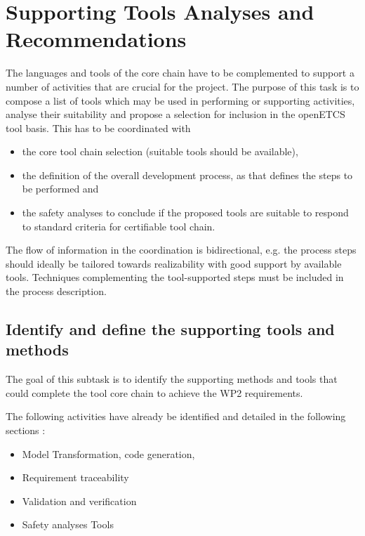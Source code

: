 \documentclass{template/openetcs_article}
\begin{document}
\section{Supporting Tools Analyses and Recommendations}
\label{sec:supporting_tools}

The languages and tools  of the core chain have to be complemented to support a number of activities that are crucial for the project. The purpose of this task is to compose a list of tools which may be
used in performing or supporting  activities, analyse their
suitability and propose a selection for inclusion in the openETCS tool
basis. This has to be coordinated with 

\begin{itemize}
\item the core tool chain selection (suitable  tools should be
  available), 
\item the definition of the overall development process, as that defines the steps to be performed and 
\item the safety analyses to  conclude if the proposed tools are suitable to  respond to standard criteria for certifiable tool chain.
\end{itemize}

The flow of information in the coordination is bidirectional, e.g. the process
steps should ideally be tailored towards realizability with good
support by available tools. Techniques complementing the
tool-supported steps must be included in the process description. 
  


\subsection{Identify and define the supporting tools and methods}


The goal of this subtask  is to identify  the supporting methods and tools that could complete the tool core chain to  achieve the WP2 requirements.

The following activities  have already be identified and detailed in the following sections :

\begin{itemize}
\item Model Transformation, code generation,
\item Requirement traceability
\item Validation and verification
\item Safety analyses Tools
\end{itemize}
\end{document}
